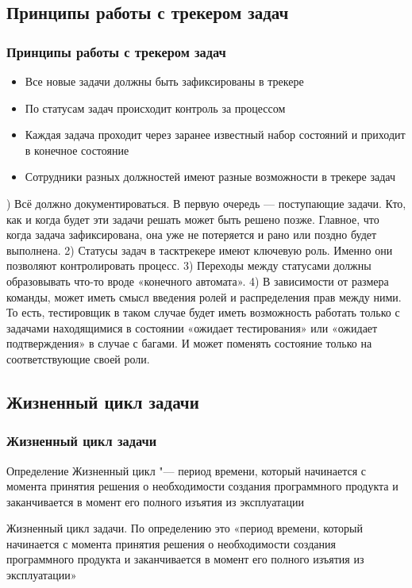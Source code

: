 \documentclass{../industrial-development}
\begin{document}
\subsection{Принципы работы с трекером задач}

\begin{frame} \frametitle{Принципы работы с трекером задач}
	\begin{itemize}
		\item Все новые задачи должны быть зафиксированы в трекере
		\item По статусам задач происходит контроль за процессом
		\item Каждая задача проходит через заранее известный набор состояний и приходит в конечное состояние
		\item Сотрудники разных должностей имеют разные возможности в трекере задач
	\end{itemize}
\end{frame}

) Всё должно документироваться. В первую очередь — поступающие задачи. Кто, как и когда будет эти задачи решать может быть решено позже. Главное, что когда задача зафиксирована, она уже не потеряется и рано или поздно будет выполнена.
2) Статусы задач в тасктрекере имеют ключевую роль. Именно они позволяют контролировать процесс.
3) Переходы между статусами должны образовывать что-то вроде «конечного автомата».
4) В зависимости от размера команды, может иметь смысл введения ролей и распределения прав между ними. То есть, тестировщик в таком случае будет иметь возможность работать только с задачами находящимися в состоянии «ожидает тестирования» или «ожидает подтверждения» в случае с багами. И может поменять состояние только на соответствующие своей роли.

\subsection{Жизненный цикл задачи}

\begin{frame} \frametitle{Жизненный цикл задачи}
\begin{block}{Определение}
    Жизненный цикл "--- период времени, который начинается с момента принятия решения о необходимости создания программного продукта и заканчивается в момент его полного изъятия из эксплуатации
  \end{block}
\end{frame}

\lecturenotes
Жизненный цикл задачи. По определению это «период времени, который начинается с момента принятия решения о необходимости создания программного продукта и заканчивается в момент его полного изъятия из эксплуатации»
\end{document}
